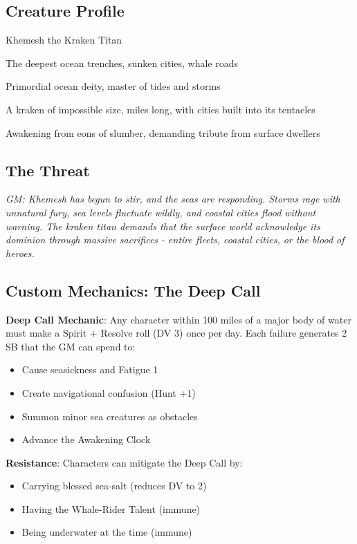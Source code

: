 \documentclass[11pt]{article}
\newcommand{\gm}[1]{\textit{GM: #1}}
\begin{document}
\subsection*{Creature Profile}

\begin{description}[leftmargin=*]
\item[Name] Khemesh the Kraken Titan
\item[Domain] The deepest ocean trenches, sunken cities, whale roads
\item[Nature] Primordial ocean deity, master of tides and storms
\item[Appearance] A kraken of impossible size, miles long, with cities built into its tentacles
\item[Motivation] Awakening from eons of slumber, demanding tribute from surface dwellers
\end{description}

\subsection*{The Threat}

\gm{Khemesh has begun to stir, and the seas are responding. Storms rage with unnatural fury, sea levels fluctuate wildly, and coastal cities flood without warning. The kraken titan demands that the surface world acknowledge its dominion through massive sacrifices - entire fleets, coastal cities, or the blood of heroes.}

\subsection*{Custom Mechanics: The Deep Call}

\begin{mdframed}[backgroundcolor=mechanicbg]
\textbf{Deep Call Mechanic}: Any character within 100 miles of a major body of water must make a Spirit + Resolve roll (DV 3) once per day. Each failure generates 2 SB that the GM can spend to:
\begin{itemize}[leftmargin=*]
\item Cause seasickness and Fatigue 1
\item Create navigational confusion (Hunt +1)
\item Summon minor sea creatures as obstacles
\item Advance the Awakening Clock
\end{itemize}

\textbf{Resistance}: Characters can mitigate the Deep Call by:
\begin{itemize}[leftmargin=*]
\item Carrying blessed sea-salt (reduces DV to 2)
\item Having the Whale-Rider Talent (immune)
\item Being underwater at the time (immune)
\end{itemize}
\end{mdframed}
\end{document}
